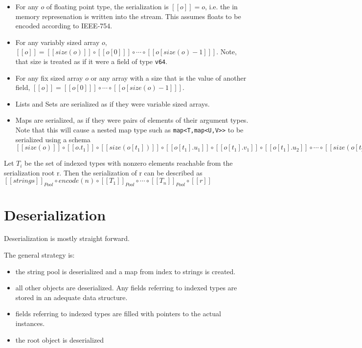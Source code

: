 \documentclass[a4paper,10pt]{article}
\newcommand{\den}[1]{[\![#1]\!]}
\begin{document}
\begin{itemize}
 \item For any $o$ of floating point type, the serialization is $\den{o} = o$, i.e. the in memory represenation is written into the stream. This assumes floats to be encoded according to IEEE-754.
 
 \item For any variably sized array $o$, $\den{o} = \den{size(o)} \circ \den{o[0]} \circ \cdots \circ \den{o[size(o)-1]}$. Note, that size is treated as if it were a field of type \texttt{v64}.
 \item For any fix sized array $o$ or any array with a size that is the value of another field, $\den{o} = \den{o[0]} \circ \cdots \circ \den{o[size(o)-1]}$.
 
 \item Lists and Sets are serialized as if they were variable sized arrays.
 
 \item Maps are serialized, as if they were pairs of elements of their argument types. Note that this will cause a nested map type such as \verb/map<T,map<U,V>>/ to be serialized using a schema $ \den{size(o)} \circ \den{o.t_1} \circ \den{size(o[t_1])} \circ \den{o[t_1].u_1} \circ \den{o[t_1].v_1} \circ \den{o[t_1].u_2} \circ \cdots \circ \den{size(o[t_2])} \circ \cdots \circ \den{o[t_n].v_m}$
\end{itemize}
 
Let $T_i$ be the set of indexed types with nonzero elements reachable from the serialization root r. Then the serialization of r can be described as $\den{strings}_{Pool} \circ encode(n) \circ \den{T_1}_{Pool} \circ \cdots \circ \den{T_n}_{Pool} \circ \den{r}$

\section{Deserialization}

Deserialization is mostly straight forward.

The general strategy is:
\begin{itemize}
 \item the string pool is deserialized and a map from index to strings is created.
 \item all other objects are deserialized. Any fields referring to indexed types are stored in an adequate data structure.
 \item fields referring to indexed types are filled with pointers to the actual instances.
 \item the root object is deserialized
\end{itemize}
\end{document}

